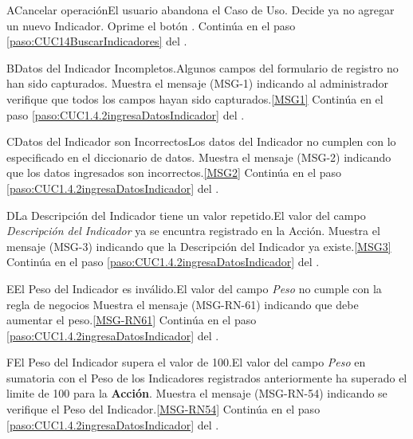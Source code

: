 % 
	\begin{UCtrayectoriaA}{A}{Cancelar operación}{El usuario abandona el Caso de Uso.}
			\UCpaso[\UCactor] Decide ya no agregar un nuevo Indicador.
			\UCpaso[\UCactor] Oprime el botón .
			\UCpaso Continúa en el paso \ref{paso:CUC14BuscarIndicadores} del .
	\end{UCtrayectoriaA}
% 
	\begin{UCtrayectoriaA}{B}{Datos del Indicador Incompletos.}{Algunos campos del formulario de registro no han sido capturados.}
			\UCpaso Muestra el mensaje (MSG-1) indicando al administrador verifique que todos los campos hayan sido capturados.\ref{MSG1}
			\UCpaso Continúa en el paso \ref{paso:CUC1.4.2ingresaDatosIndicador} del .
	\end{UCtrayectoriaA}
% 
	\begin{UCtrayectoriaA}{C}{Datos del Indicador son Incorrectos}{Los datos del Indicador no cumplen con lo especificado en el diccionario de datos.}
			\UCpaso Muestra el mensaje (MSG-2) indicando que los datos ingresados son incorrectos.\ref{MSG2}
			\UCpaso Continúa en el paso \ref{paso:CUC1.4.2ingresaDatosIndicador} del .
	\end{UCtrayectoriaA}
% 
	\begin{UCtrayectoriaA}{D}{La Descripción del Indicador tiene un valor repetido.}{El valor del campo \textit{Descripción del Indicador} ya se encuntra registrado en la Acción.}
			\UCpaso Muestra el mensaje (MSG-3) indicando que la Descripción del Indicador ya existe.\ref{MSG3}
			\UCpaso Continúa en el paso \ref{paso:CUC1.4.2ingresaDatosIndicador} del .
	\end{UCtrayectoriaA}
	\begin{UCtrayectoriaA}{E}{El Peso del Indicador es inválido.}{El valor del campo \textit{Peso} no cumple con la regla de negocios }
			\UCpaso Muestra el mensaje (MSG-RN-61) indicando que debe aumentar el peso.\ref{MSG-RN61}
			\UCpaso Continúa en el paso \ref{paso:CUC1.4.2ingresaDatosIndicador} del .
	\end{UCtrayectoriaA}
	\begin{UCtrayectoriaA}{F}{El Peso del Indicador supera el valor de 100.}{El valor del campo \textit{Peso} en sumatoria con el Peso de los Indicadores registrados anteriormente ha superado el limite de 100 para la \textbf{Acción}.}
			\UCpaso Muestra el mensaje (MSG-RN-54) indicando se verifique el Peso del Indicador.\ref{MSG-RN54}
			\UCpaso Continúa en el paso \ref{paso:CUC1.4.2ingresaDatosIndicador} del .
	\end{UCtrayectoriaA}

